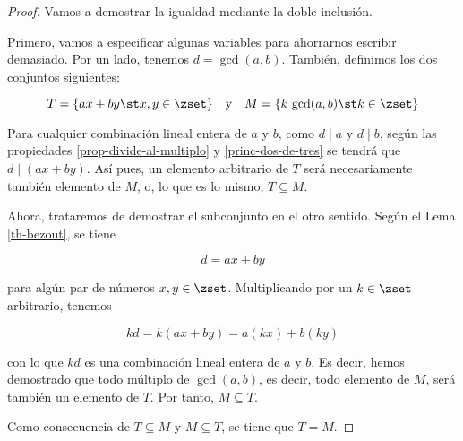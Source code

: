 \begin{proof}
  \iffalse
  Llamamos $d$ al $\gcd(a, b)$. Por el Lema \ref{th-bezout}, tenemos que

  $$ d = ax + by $$

  \noindent para algún par de números $x, y \in \zset$. Multiplicando por un
  $k \in \zset$ en ambas partes de la igualdad tenemos:

  $$ kd = k(ax + by) = akx + bky = a(kx) + b(ky) $$

  Ahora, podemos aplicar un par de cambios de variables y pasar a llamar $x$
  a $kx$ e $y$ a $ky$, ya que la multiplicación de $(\zset, +, \cdot)$ es
  una operación interna. Por tanto,

  $$ k \gcd(a, b) = ax + by $$

  \fi

  Vamos a demostrar la igualdad mediante la doble inclusión.

  Primero, vamos a especificar algunas variables para ahorrarnos escribir
  demasiado. Por un lado, tenemos $d = \gcd(a, b)$. También, definimos los
  dos conjuntos siguientes:

  $$ T = \{ax + by \st x, y \in \zset\} \quad \text{y} \quad M = \{k \,
  \gcd(a, b) \st k \in \zset\} $$

  Para cualquier combinación lineal entera de $a$ y $b$, como $d \mid a$ y
  $d \mid b$, según las propiedades \ref{prop-divide-al-multiplo} y
  \ref{princ-dos-de-tres} se tendrá que $d \mid (ax + by)$. Así pues, un
  elemento arbitrario de $T$ será necesariamente también elemento de $M$, o,
  lo que es lo mismo, $T \subseteq M$.

  Ahora, trataremos de demostrar el subconjunto en el otro sentido. Según el
  Lema \ref{th-bezout}, se tiene

  $$ d = ax + by $$

  \noindent para algún par de números $x, y \in \zset$. Multiplicando por un
  $k \in \zset$ arbitrario, tenemos

  $$ kd = k(ax + by) = a(kx) + b(ky) $$

  \noindent con lo que $kd$ es una combinación lineal entera de $a$ y $b$.
  Es decir, hemos demostrado que todo múltiplo de $\gcd(a, b)$, es decir,
  todo elemento de $M$, será también un elemento de $T$. Por tanto, $M
  \subseteq T$.

  Como consecuencia de $T \subseteq M$ y $M \subseteq T$, se tiene que $T =
  M$.
\end{proof}


